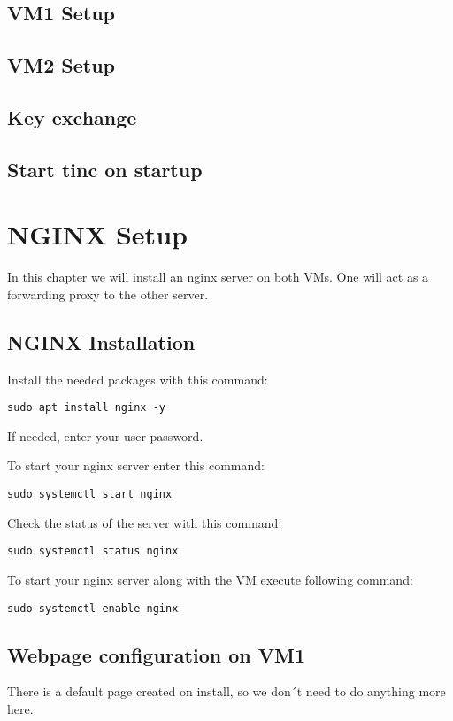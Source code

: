 \documentclass[10pt,a4paper]{article}
\begin{document}
\subsection{VM1 Setup}

\subsection{VM2 Setup}

\subsection{Key exchange}

\subsection{Start tinc on startup}

\newpage
\section{NGINX Setup}
In this chapter we will install an nginx server on both VMs. One will act as a forwarding proxy to the other server.

\subsection{NGINX Installation}
Install the needed packages with this command:
\begin{verbatim}
sudo apt install nginx -y
\end{verbatim}

If needed, enter your user password.

To start your nginx server enter this command:
\begin{verbatim}
sudo systemctl start nginx
\end{verbatim}

Check the status of the server with this command:
\begin{verbatim}
sudo systemctl status nginx
\end{verbatim}

To start your nginx server along with the VM execute following command:
\begin{verbatim}
sudo systemctl enable nginx
\end{verbatim}

\subsection{Webpage configuration on VM1}
There is a default page created on install, so we don´t need to do anything more here.
\end{document}
